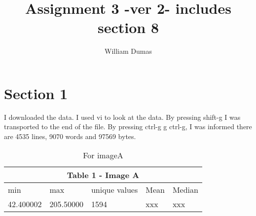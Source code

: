 \documentclass{article}
\begin{document}
\title{Assignment 3 -ver 2- includes section 8}

\author{William Dumas}
\maketitle

\section{Section 1}
I downloaded the data.
I used vi to look at the data. By pressing shift-g I was transported
to the end of the file. By pressing ctrl-g g ctrl-g, I was informed
there are 4535 lines, 9070 words and 97569 bytes. 

\begin{table}[b]
\begin{tabular}{| l | l | l | l | l |}
\hline
\multicolumn{5}{|c|}{Table 1 - Image A} \\
\hline
min & max & unique values & Mean & Median \\
\hline
42.400002 & 205.50000        &    1594     & xxx              & xxx         \\
\hline      
\end{tabular}
\caption*{For imageA}
\end{table}
\end{document}
